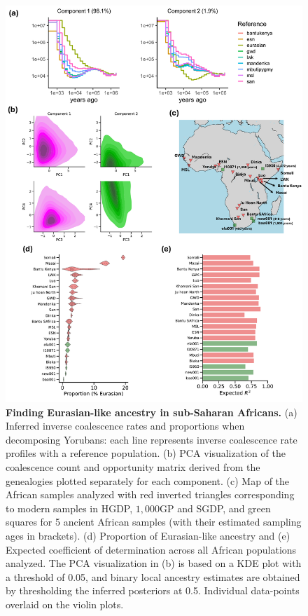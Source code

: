 \begin{figure}[h!]
    \centering
    \includegraphics[width=\linewidth]{figures/gb_bta/gb_real_bta_1.pdf}
    \captionsetup{width=\textwidth+3cm}
    \caption{
    \footnotesize
    \textbf{Finding Eurasian-like ancestry in sub-Saharan Africans.} (a) Inferred inverse coalescence rates and proportions when decomposing Yorubans: each line represents inverse coalescence rate profiles with a reference population. (b) PCA visualization of the coalescence count and opportunity matrix derived from the genealogies plotted separately for each component. (c) Map of the African samples analyzed with red inverted triangles corresponding to modern samples in HGDP, $1{,}000$GP and SGDP, and green squares for 5 ancient African samples (with their estimated sampling ages in brackets). (d) Proportion of Eurasian-like ancestry and (e) Expected coefficient of determination across all African populations analyzed. The PCA visualization in (b) is based on a KDE plot with a threshold of 0.05, and binary local ancestry estimates are obtained by thresholding the inferred posteriors at 0.5. Individual data-points overlaid on the violin plots. 
    }
    \label{fig:gb_bta_1}
\end{figure}

